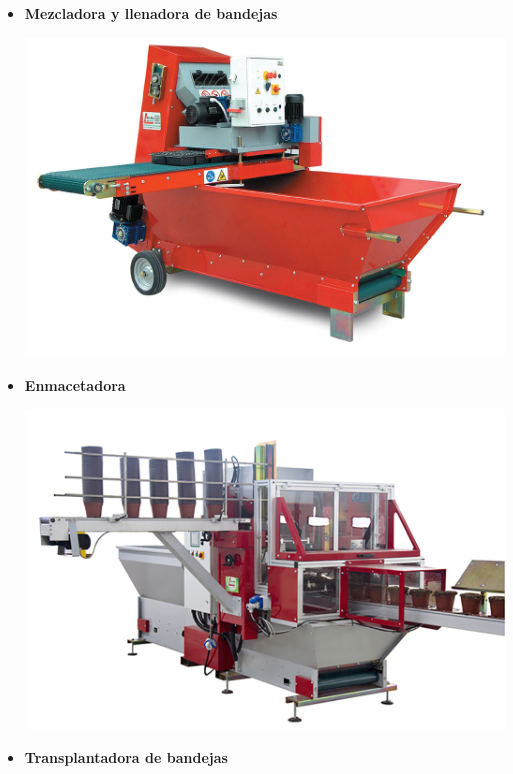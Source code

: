 \documentclass[a4paper,12pt,oneside]{article}
\begin{document}
\begin{itemize}
\begin{center}
\end{center}
\item \textbf{Mezcladora y llenadora de bandejas}
\begin{center}
\includegraphics[width=.9\linewidth]{./img_uf1596/bandejas_mezcladora.jpg}
\end{center}
\item \textbf{Enmacetadora}
\begin{center}
\includegraphics[width=.9\linewidth]{./img_uf1596/enmacetadora.jpg}
\end{center}
\item \textbf{Transplantadora de bandejas}
\begin{center}

\end{center}
\end{itemize}
\end{document}
